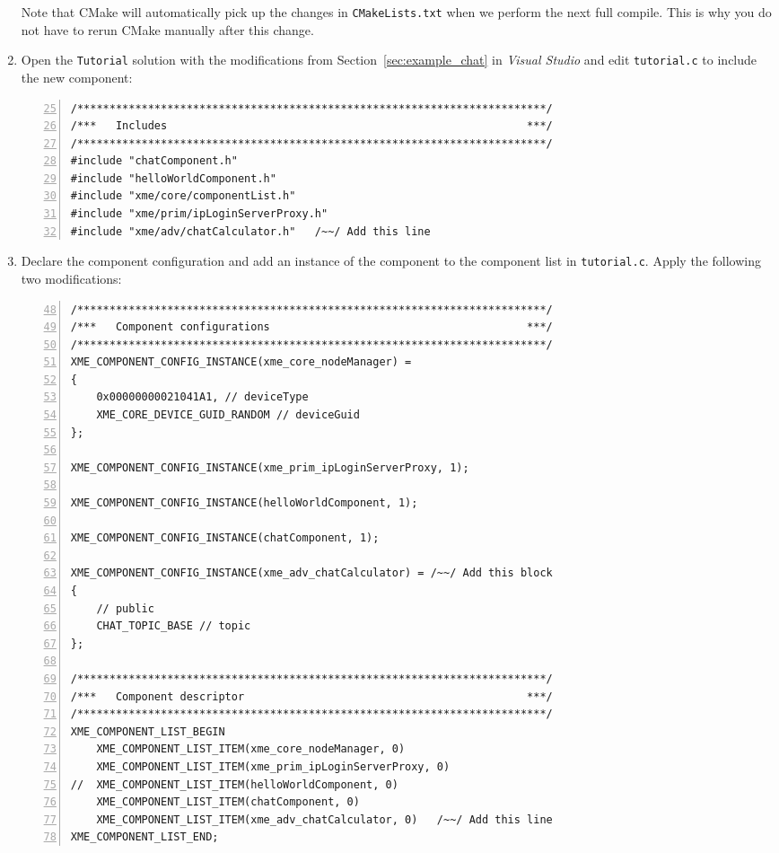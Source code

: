 \begin{enumerate}
		Note that CMake will automatically pick up the changes in \verb|CMakeLists.txt| when we perform the next full compile.
		This is why you do not have to rerun CMake manually after this change.

	\item Open the \verb|Tutorial| solution with the modifications from Section~\ref{sec:example_chat} in \emph{Visual Studio}
		and edit \verb|tutorial.c| to include the new component:

	\begin{lstlisting}[numbers=left,firstnumber=25]
/*************************************************************************/
/***   Includes                                                        ***/
/*************************************************************************/
#include "chatComponent.h"
#include "helloWorldComponent.h"
#include "xme/core/componentList.h"
#include "xme/prim/ipLoginServerProxy.h"
#include "xme/adv/chatCalculator.h"   /~~/ Add this line
\end{lstlisting}

	\item Declare the component configuration and add an instance of the component
		to the component list in \verb|tutorial.c|. Apply the following two modifications:

\begin{lstlisting}[numbers=left,firstnumber=48]
/*************************************************************************/
/***   Component configurations                                        ***/
/*************************************************************************/
XME_COMPONENT_CONFIG_INSTANCE(xme_core_nodeManager) =
{
	0x00000000021041A1, // deviceType
	XME_CORE_DEVICE_GUID_RANDOM // deviceGuid
};

XME_COMPONENT_CONFIG_INSTANCE(xme_prim_ipLoginServerProxy, 1);

XME_COMPONENT_CONFIG_INSTANCE(helloWorldComponent, 1);

XME_COMPONENT_CONFIG_INSTANCE(chatComponent, 1);

XME_COMPONENT_CONFIG_INSTANCE(xme_adv_chatCalculator) = /~~/ Add this block
{
	// public
	CHAT_TOPIC_BASE // topic
};

/*************************************************************************/
/***   Component descriptor                                            ***/
/*************************************************************************/
XME_COMPONENT_LIST_BEGIN
	XME_COMPONENT_LIST_ITEM(xme_core_nodeManager, 0)
	XME_COMPONENT_LIST_ITEM(xme_prim_ipLoginServerProxy, 0)
//	XME_COMPONENT_LIST_ITEM(helloWorldComponent, 0)
	XME_COMPONENT_LIST_ITEM(chatComponent, 0)
	XME_COMPONENT_LIST_ITEM(xme_adv_chatCalculator, 0)   /~~/ Add this line
XME_COMPONENT_LIST_END;
\end{lstlisting}


\end{enumerate}
